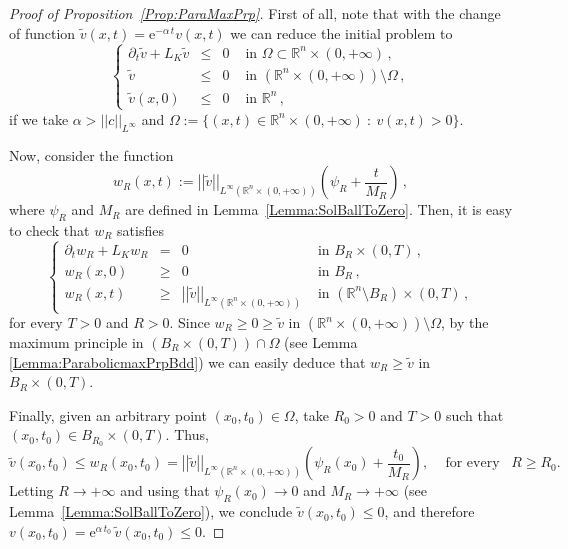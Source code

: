 \documentclass[12pt,reqno]{amsart}
\theoremstyle{definition}
\theoremstyle{remark}
\newcommand{\con}[1]{\mathbb{#1}}
\newcommand{\R}{\con{R}} %
\newcommand{\e}{\mathrm{e}}
\newcommand{\norm}[1]{\left | \left |{#1} \right | \right |}
\newcommand\beqc[1]{\left\{\begin{array}{#1}}
\newcommand\eeqc{\end{array} \right.}
\def\PDEsystem{rcll}
\numberwithin{equation}{section}
\begin{document}
\begin{proof}[Proof of Proposition~\ref{Prop:ParaMaxPrp}]
	First of all, note that with the change of function $\tilde{v}(x,t) = \e^{-\alpha\,t} v(x,t)$ we can reduce the initial problem to
	\begin{equation*}
	\beqc{\PDEsystem}
	\partial_t \tilde{v} + L_K  \tilde{v} &\leq& 0 & \textrm{ in } \Omega \subset\R^n\times(0,+\infty)\,,\\
	\tilde{v} &\leq& 0 & \textrm{ in }  \left(\R^n\times(0,+\infty)\right) \setminus  \Omega\,,\\
	\tilde{v}(x,0)&\leq& 0 & \textrm{ in } \R^n\,,
	\eeqc
	\end{equation*}
	if we take $\alpha > ||c||_{L^\infty}$ and $\Omega := \{(x,t)\in \R^n\times(0,+\infty) \ : \ v(x,t) > 0\}$.
	
	Now, consider the function 
	$$ 
	w_R(x,t) := \norm{\tilde{v} }_{L^\infty(\R^n \times (0,+\infty))} \left( \psi_R + \dfrac{t}{M_R} \right)\,,
	$$
	where $\psi_R$ and $M_R$ are defined in Lemma~\ref{Lemma:SolBallToZero}. Then, it is easy to check that $w_R$ satisfies
	\begin{equation*}
	\beqc{\PDEsystem}
	\partial_t w_R + L_K  w_R &=& 0 & \textrm{ in }B_R\times(0,T)\,,\\
	w_R(x,0) &\geq& 0 & \textrm{ in } B_R\,,\\
	w_R(x,t) &\geq& \norm{\tilde{v}}_{L^\infty(\R^n \times (0,+\infty))}  & \textrm{ in } \left( \R^n\setminus B_R\right) \times (0,T) \,,
	\eeqc
	\end{equation*}
	for every $T>0$ and $R>0$. Since $w_R \geq 0 \geq \tilde{v}$ in  $\left(\R^n\times(0,+\infty)\right)\setminus \Omega$, by the maximum principle in $(B_R\times (0,T))\cap \Omega$ (see Lemma \ref{Lemma:ParabolicmaxPrpBdd}) we can easily deduce that $ w_R\geq \tilde{v} $ in $B_R\times(0,T)$.
	
	Finally, given an arbitrary point $(x_0,t_0) \in \Omega$, take $R_0>0$ and $T>0$ such that $(x_0,t_0)\in B_{R_0}\times (0,T)$. Thus,
	$$ 
	\tilde{v}(x_0,t_0) \leq w_R(x_0,t_0) =  \norm{\tilde{v} }_{L^\infty(\R^n \times (0,+\infty))} \left( \psi_R (x_0) + \dfrac{t_0}{M_R} \right), \,\,\,\,\,\text{ for every }\,\,\, R\geq R_0.
	$$
	Letting $R \to +\infty$ and using that $\psi_R(x_0) \to 0$ and $M_R \to +\infty$ (see Lemma~\ref{Lemma:SolBallToZero}), we conclude $ \tilde{v}(x_0,t_0) \leq  0$, and therefore $ v(x_0,t_0) = \e^{\alpha\,t_0}\,\tilde{v}(x_0,t_0) \leq 0$.
\end{proof}

\end{document}
